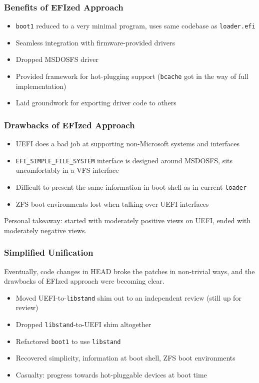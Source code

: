 \documentclass{beamer}
\begin{document}
\begin{frame}
  \frametitle{Benefits of EFIzed Approach}
  \begin{itemize}
  \item \texttt{boot1} reduced to a very minimal program, uses same
    codebase as \texttt{loader.efi}
  \item Seamless integration with firmware-provided drivers
  \item Dropped MSDOSFS driver
  \item Provided framework for hot-plugging support (\texttt{bcache}
    got in the way of full implementation)
  \item Laid groundwork for exporting driver code to others
  \end{itemize}
\end{frame}

\begin{frame}
  \frametitle{Drawbacks of EFIzed Approach}
  \begin{itemize}
  \item UEFI does a bad job at supporting non-Microsoft systems and
    interfaces
  \item \texttt{EFI\_SIMPLE\_FILE\_SYSTEM} interface is designed
    around MSDOSFS, sits uncomfortably in a VFS interface
  \item Difficult to present the same information in boot shell as in
    current \texttt{loader}
  \item ZFS boot environments lost when talking over UEFI interfaces
  \end{itemize}
  Personal takeaway: started with moderately positive views on UEFI,
  ended with moderately negative views.
\end{frame}

\begin{frame}
  \frametitle{Simplified Unification}

  Eventually, code changes in HEAD broke the patches in non-trivial
  ways, and the drawbacks of EFIzed approach were becoming clear.
  \begin{itemize}
  \item Moved UEFI-to-\texttt{libstand} shim out to an independent
    review (still up for review)
  \item Dropped \texttt{libstand}-to-UEFI shim altogether
  \item Refactored \texttt{boot1} to use \texttt{libstand}
  \item Recovered simplicity, information at boot shell, ZFS boot environments
  \item Casualty: progress towards hot-pluggable devices at boot time
  \end{itemize}
\end{frame}
\end{document}
